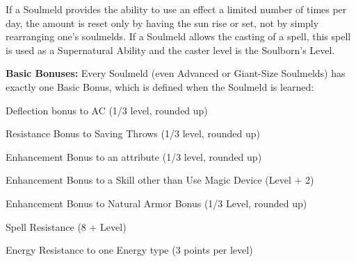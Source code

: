 If a Soulmeld provides the ability to use an effect a limited number of times per day, the amount is reset only by having the sun rise or set, not by simply rearranging one's soulmelds. If a Soulmeld allows the casting of a spell, this spell is used as a Supernatural Ability and the caster level is the Soulborn's Level.

\textbf{Basic Bonuses:} Every Soulmeld (even Advanced or Giant-Size Soulmelds) has exactly one Basic Bonus, which is defined when the Soulmeld is learned:
\begin{itemize*}
\item Deflection bonus to AC (1/3 level, rounded up)
\item Resistance Bonus to Saving Throws (1/3 level, rounded up)
\item Enhancement Bonus to an attribute (1/3 level, rounded up)
\item Enhancement Bonus to a Skill other than Use Magic Device (Level + 2)
\item Enhancement Bonus to Natural Armor Bonus (1/3 Level, rounded up)
\item Spell Resistance (8 + Level)
\item Energy Resistance to one Energy type (3 points per level)
\end{itemize*}


